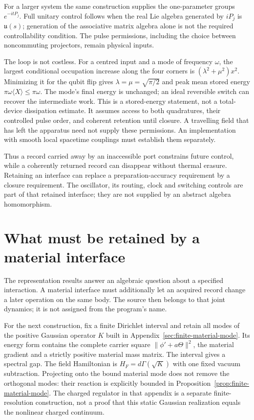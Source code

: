 For a larger system the same construction supplies the one-parameter groups
$e^{-itP_j}$. Full unitary control follows when the real Lie algebra generated by
$iP_j$ is $\mathfrak u(s)$; generation of the associative matrix algebra alone is
not the required controllability condition. The pulse permissions, including the
choice between noncommuting projectors, remain physical inputs.

The loop is not costless. For a centred input and a mode of frequency $\omega$,
the largest conditional occupation increase along the four corners is
$(\lambda^2+\mu^2)x^2$. Minimizing it for the qubit flip gives
$\lambda=\mu=\sqrt{\pi/2}$ and peak mean stored energy
$\pi\omega\langle X\rangle\le\pi\omega$. The mode's final energy is unchanged;
an ideal reversible switch can recover the intermediate work. This is a stored-energy
statement, not a total-device dissipation estimate. It assumes access to both quadratures,
their controlled pulse order, and coherent retention until closure. A travelling field
that has left the apparatus need not supply these permissions. An implementation with
smooth local spacetime couplings must establish them separately.

Thus a record carried away by an inaccessible port constrains future control, while
a coherently returned record can disappear without thermal erasure. Retaining an
interface can replace a preparation-accuracy requirement by a closure requirement.
The oscillator, its routing, clock and switching controls are part of that retained
interface; they are not supplied by an abstract algebra homomorphism.

\section{What must be retained by a material interface}
\label{sec:material-roadmap}

The representation results answer an algebraic question about a specified
interaction. A material interface must additionally let an acquired record
change a later operation on the same body. The source then belongs to that
joint dynamics; it is not assigned from the program's name.

For the next construction, fix a finite Dirichlet interval and retain all
modes of the positive Gaussian operator $K$ built in
Appendix~\ref{sec:finite-material-mode}. Its energy form contains the
complete carrier square $\|\phi'+a\Theta\|^2$, the material gradient
and a strictly positive material mass matrix. The interval gives a
spectral gap. The field Hamiltonian is $H_F=d\Gamma(\sqrt K)$ with
one fixed vacuum subtraction. Projecting onto the bound material mode
does not remove the orthogonal modes: their reaction is explicitly
bounded in Proposition~\ref{prop:finite-material-mode}.
The charged regulator in that appendix is a separate finite-resolution
construction, not a proof that this static Gaussian realization
equals the nonlinear charged continuum.

